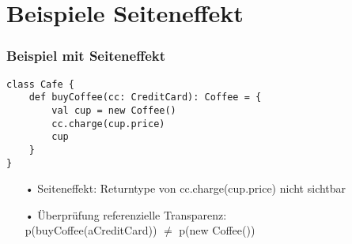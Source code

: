 	\section[Section]{Beispiele Seiteneffekt}
		\begin{frame}[fragile]
		\frametitle{Beispiel mit Seiteneffekt}
		\begin{lstlisting}[style=myScalastyle]
class Cafe {
	def buyCoffee(cc: CreditCard): Coffee = {
		val cup = new Coffee()
		cc.charge(cup.price)
		cup
	}
}
\end{lstlisting}
\begin{itemize}
				\item[•] Seiteneffekt: Returntype von cc.charge(cup.price) nicht sichtbar
				\item[•] Überprüfung referenzielle Transparenz: \\ p(buyCoffee(aCreditCard)) $\neq$ p(new Coffee())
				\end{itemize}

\end{frame}
		
			